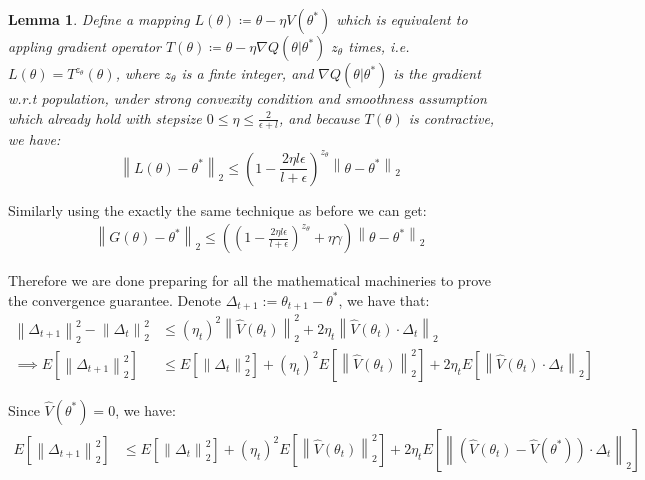 \documentclass{article}
\newtheorem{lemma}{Lemma}
\begin{document}
\begin{lemma}
  Define a mapping $L(\theta) \coloneqq \theta - \eta V(\theta^*) $ which is equivalent to appling gradient operator $T(\theta)\coloneqq \theta - \eta \nabla Q(\theta|\theta^*)$ $z_{\theta}$ times, i.e. $L(\theta) = T^{z_{\theta}}(\theta)$, where $z_{\theta}$ is a finte integer, and $\nabla Q(\theta|\theta^*)$  is the gradient w.r.t population, under strong
  convexity condition and smoothness assumption which already hold with stepsize $0 \leq \eta \leq \frac{2}{\epsilon+l}$, and because $T(\theta)$ is contractive, we have:
  \begin{equation}
    \left\lVert L(\theta) - \theta^* \right\lVert_2 \leq (1 - \frac{2\eta l \epsilon}{l+ \epsilon})^{z_{\theta}}\left\lVert \theta - \theta^* \right\lVert_2
  \label{contraction}
  \end{equation} 
  \label{contractive3}
\end{lemma}

Similarly using the exactly the same technique as before we can get:
\begin{equation}
  \begin{aligned}
    \left\lVert G(\theta) - \theta^* \right\lVert_2  \leq ((1 - \frac{2\eta l \epsilon}{l+ \epsilon})^{z_{\theta}} + \eta \gamma)\left\lVert \theta - \theta^* \right\lVert_2
  \end{aligned}
 \end{equation}

 Therefore we are done preparing for all the mathematical machineries to prove the convergence guarantee. Denote $\Delta_{t+1}:= \theta_{t+1} - \theta^*$, we have that:
 \begin{equation}
   \begin{aligned}
     \left\lVert\Delta_{t+1}\right\lVert_2^2 - \left\lVert\Delta_{t}\right\lVert_2^2 & \leq (\eta_t)^2 \left\lVert\hat{V}(\theta_{t})\right\lVert_2^2 + 2\eta_t \left\lVert\hat{V}(\theta_{t}) \cdot \Delta_t \right\lVert_2 \\ \nonumber
   \implies E[ \left\lVert\Delta_{t+1}\right\lVert_2^2 ] & \leq E[\left\lVert\Delta_{t}\right\lVert_2^2] + (\eta_t)^2 E[\left\lVert\hat{V}(\theta_{t})\right\lVert_2^2] + 2\eta_t E[\left\lVert\hat{V}(\theta_{t}) \cdot \Delta_t \right\lVert_2 ]
    \end{aligned}
  \end{equation}

  Since $\hat{V}(\theta^*) = 0$, we have:
  \begin{equation}
    \begin{aligned}
    E[ \left\lVert\Delta_{t+1}\right\lVert_2^2 ] & \leq E[\left\lVert\Delta_{t}\right\lVert_2^2] + (\eta_t)^2 E[\left\lVert\hat{V}(\theta_{t})\right\lVert_2^2] + 2\eta_t E[\left\lVert(\hat{V}(\theta_{t}) -\hat{V}(\theta^*) )  \cdot \Delta_t \right\lVert_2 ]  \nonumber
     \end{aligned}
   \end{equation}
\end{document}
